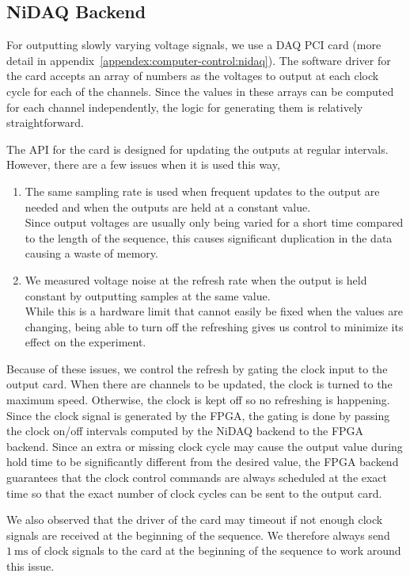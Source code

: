 \subsection{NiDAQ Backend}
\label{ch:computer-control:backend:nidaq}
For outputting slowly varying voltage signals, we use a DAQ PCI card
(more detail in appendix~\ref{appendex:computer-control:nidaq}).
The software driver for the card accepts an array of numbers as the voltages
to output at each clock cycle for each of the channels.
Since the values in these arrays can be computed for each channel independently,
the logic for generating them is relatively straightforward.

The API for the card is designed for updating the outputs at regular intervals.
However, there are a few issues when it is used this way,
\begin{enumerate}
\item The same sampling rate is used when frequent updates to the output are needed
  and when the outputs are held at a constant value.\\
  Since output voltages are usually only being varied for a short time compared
  to the length of the sequence,
  this causes significant duplication in the data causing a waste of memory.
\item We measured voltage noise at the refresh rate when the output is held constant
  by outputting samples at the same value.\\
  While this is a hardware limit that cannot easily be fixed when the values are changing,
  being able to turn off the refreshing gives us control to minimize its effect
  on the experiment.
\end{enumerate}
Because of these issues, we control the refresh by gating the clock input to the output card.
When there are channels to be updated, the clock is turned to the maximum speed.
Otherwise, the clock is kept off so no refreshing is happening.
Since the clock signal is generated by the FPGA, the gating is done
by passing the clock on/off intervals computed by the NiDAQ backend to the FPGA backend.
Since an extra or missing clock cycle may cause the output value during hold time
to be significantly different from the desired value,
the FPGA backend guarantees that the clock control commands are always scheduled
at the exact time so that the exact number of clock cycles can be sent to the output card.

We also observed that the driver of the card may timeout if not enough clock signals are received
at the beginning of the sequence. We therefore always send $1~\mathrm{ms}$
of clock signals to the card at the beginning of the sequence to work around this issue.

